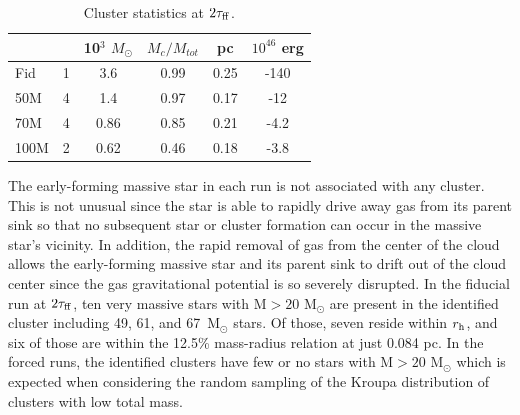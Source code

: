 \documentclass[twoside]{drexel-thesis}
\begin{document}
\begin{thesis}
\begin{table}[!htb]
 \caption{Cluster statistics at $2\tau_{\rm ff}$.}
 \label{tab:cluster_stats_2tff}
 \begin{tabular}{lccccc} 
  \hline
  &  & 10$^3$ $M_{\odot}$ & $M_{c}/M_{tot}$ & pc & $10^{46}$ erg\\
  \hline
  Fid & 1 & 3.6 & 0.99 & 0.25 & -140 \\
  50M & 4 & 1.4 & 0.97 & 0.17 & -12 \\
  70M & 4 & 0.86 & 0.85 & 0.21 & -4.2 \\
  100M & 2 & 0.62 & 0.46 & 0.18 & -3.8 \\
  \hline
 \end{tabular}
\end{table}

The early-forming massive star in each run is not associated with any cluster.
This is not unusual since the star is able to rapidly drive away gas from its parent sink so that no subsequent star or cluster formation can occur in the massive star's vicinity. In addition, the rapid removal of gas from the center of the cloud allows the early-forming massive star and its parent sink to drift out of the cloud center since the gas gravitational potential is so severely disrupted. 
In the fiducial run at $2\tau_{\rm ff}$, ten very massive stars with M$>20$ M$_\odot$ are present in the identified cluster including 49, 61, and 67~M$_\odot$ stars. Of those, seven reside within $r_{\rm h}$, and six of those are within the 12.5\% mass-radius relation at just 0.084 pc. In the forced runs, the identified clusters have few or no stars with M$>20$ M$_\odot$ which is expected when considering the random sampling of the Kroupa distribution \citep{weidner_maximum_2006} of clusters with low total mass. 


\end{thesis}
\end{document}
